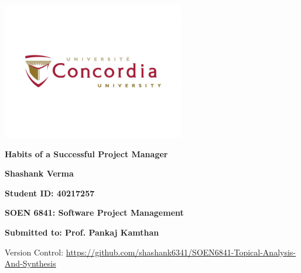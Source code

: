 \documentclass{article}
\begin{document}
\begin{titlepage}
    \centering
    \vspace*{1cm}
    \includegraphics[width=0.6\textwidth]{Logo.jpg} %
    \par\vspace{0.5cm}
    {\Huge\textbf{Habits of a Successful Project Manager}\par}
    \vspace{1.5cm}
    {\Large\textbf{Shashank Verma}\par}
    \vspace{0.5cm}
    {\textbf{Student ID: 40217257}\par}
    \vspace{2cm}
    {\Large\textbf{SOEN 6841: Software Project Management}\par}
    \vspace{1cm}
    {\large\textbf{Submitted to:  Prof. Pankaj Kamthan}\par} %
    \vfill
    Version Control:
\url{https://github.com/shashank6341/SOEN6841-Topical-Analysis-And-Synthesis}
\end{titlepage}

\newpage
\tableofcontents
\newpage
{}

\end{document}
